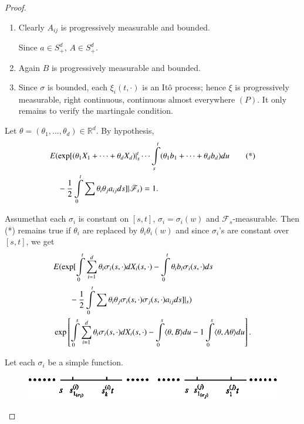 \begin{proof}
\begin{enumerate}
\renewcommand{\theenumi}{\roman{enumi}}
\renewcommand{\labelenumi}{(\theenumi)}
\item Clearly $A_{ij}$ is progressively measurable and bounded. 

Since  $a\in S^{d}_{+}$, $A\in S^{d}_{+}$.

\item Again $B$ is progressively measurable and bounded.

\item Since $\sigma$ is bounded, each $\xi_{i}(t,\cdot)$ is an It\^o
  process; hence $\xi$ is progressively measurable, right continuous,
  continuous almost everywhere $(P)$. It only remains to verify the
  martingale condition.
\end{enumerate}

\setcounter{step}{0}
\begin{step}%
Let $\theta=(\theta_{1},\ldots,\theta_{d})\in \mathbb{R}^{d}$. By
hypothesis,
\begin{align*}
&E(\exp[(\theta_{1}X_{1}+\cdots+\theta_{d}X_{d})|^{t}_{s}\cdots\int\limits^{t}_{s}(\theta_{1}b_{1}+\cdots+\theta_{d}b_{d})du\tag{*}\\
&\quad
    {}-\frac{1}{2}\int\limits^{t}_{0}\sum\theta_{i}\theta_{j}a_{ij}ds]|\mathscr{F}_{s})=1. 
\end{align*}

Assume\pageoriginale that each $\sigma_{i}$ is constant on $[s,t]$,
$\sigma_{i}=\sigma_{i}(w)$ and $\mathscr{F}_{s}$-measurable. Then (*)
remains true if $\theta_{i}$ are replaced by $\theta_{i}\theta_{i}(w)$
and since $\sigma_{i}$'s are constant over $[s,t]$, we get
\begin{align*}
& E(\exp[\int\limits^{t}_{0}\sum^{d}_{i=1}\theta_{i}\sigma_{i}(s,\cdot)dX_{i}(s,\cdot)-\int\limits^{t}_{0}\theta_{i}b_{i}\sigma_{i}(s,\cdot)ds\\
&\qquad -\frac{1}{2}\int\limits^{t}_{0}\sum
    \theta_{i}\theta_{j}\sigma_{i}(s,\cdot)\sigma_{j}(s,\cdot)a_{ij}ds]|_{s})\\
&
  \exp\left[\int\limits^{s}_{0}\sum^{d}_{i=1}\theta_{i}\sigma_{i}(s,\cdot)dX_{i}(s,\cdot)-\int\limits^{s}_{0}\langle
    \theta,B\rangle du-1\int\limits^{s}_{0}\langle
    \theta,A\theta\rangle du\right].
\end{align*}
\end{step}

\begin{step}%
Let each $\sigma_{i}$ be a simple function.
\begin{figure}[H]
\centering
\includegraphics{figure/fig10.eps}
\end{figure}


\end{step}
\end{proof}
